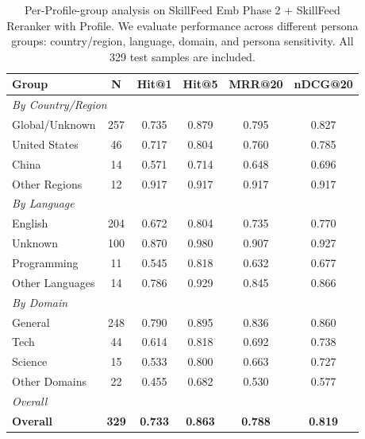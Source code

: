 \documentclass[letterpaper]{article} %
\begin{document}
\begin{table}[!htbp]
\centering
\caption[Per-Profile-group analysis]{Per-Profile-group analysis on SkillFeed Emb Phase 2 + SkillFeed Reranker with Profile. We evaluate performance across different persona groups: country/region, language, domain, and persona sensitivity. All 329 test samples are included.}
\label{tab:persona_analysis}
\begin{tabular}{l c c c c c}
\toprule
\textbf{Group} & \textbf{N} & \textbf{Hit@1} & \textbf{Hit@5} & \textbf{MRR@20} & \textbf{nDCG@20} \\
\midrule
\multicolumn{6}{l}{\textit{By Country/Region}} \\
Global/Unknown & 257 & 0.735 & 0.879 & 0.795 & 0.827 \\
United States & 46 & 0.717 & 0.804 & 0.760 & 0.785 \\
China & 14 & 0.571 & 0.714 & 0.648 & 0.696 \\
Other Regions & 12 & 0.917 & 0.917 & 0.917 & 0.917 \\
\midrule
\multicolumn{6}{l}{\textit{By Language}} \\
English & 204 & 0.672 & 0.804 & 0.735 & 0.770 \\
Unknown & 100 & 0.870 & 0.980 & 0.907 & 0.927 \\
Programming & 11 & 0.545 & 0.818 & 0.632 & 0.677 \\
Other Languages & 14 & 0.786 & 0.929 & 0.845 & 0.866 \\
\midrule
\multicolumn{6}{l}{\textit{By Domain}} \\
General & 248 & 0.790 & 0.895 & 0.836 & 0.860 \\
Tech & 44 & 0.614 & 0.818 & 0.692 & 0.738 \\
Science & 15 & 0.533 & 0.800 & 0.663 & 0.727 \\
Other Domains & 22 & 0.455 & 0.682 & 0.530 & 0.577 \\
\midrule
\multicolumn{6}{l}{\textit{Overall}} \\
\textbf{Overall} & \textbf{329} & \textbf{0.733} & \textbf{0.863} & \textbf{0.788} & \textbf{0.819} \\
\bottomrule
\end{tabular}%
\end{table}
\end{document}
